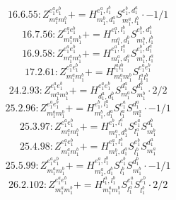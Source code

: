 \documentclass[letterpaper,10pt,fleqn,leqno,onecolumn]{article}
\begin{document}
\begin{equation} \;\;\;\;\;\;  16.6.55: Z^{e_{1}^{a}e_{1}^{b}}_{m_{1}^{a}m_{1}^{b}}+=H^{e_{1}^{a},l_{1}^{b}}_{m_{1}^{b},d_{1}^{a}}S^{e_{1}^{b},d_{1}^{a}}_{m_{1}^{a},l_{1}^{b}}\cdot -1/1 \end{equation}
\begin{equation} \;\;\;\;\;\;  16.7.56: Z^{e_{1}^{a}e_{1}^{b}}_{m_{1}^{a}m_{1}^{b}}+=H^{e_{1}^{a},l_{1}^{b}}_{m_{1}^{a},d_{1}^{b}}S^{e_{1}^{b},d_{1}^{b}}_{m_{1}^{b},l_{1}^{b}} \end{equation}
\begin{equation} \;\;\;\;\;\;  16.9.58: Z^{e_{1}^{a}e_{1}^{b}}_{m_{1}^{a}m_{1}^{b}}+=H^{e_{1}^{a},l_{1}^{a}}_{m_{1}^{a},d_{1}^{a}}S^{e_{1}^{b},d_{1}^{a}}_{m_{1}^{b},l_{1}^{a}} \end{equation}
\begin{equation} \;\;\;\;\;\;  17.2.61: Z^{e_{1}^{a}e_{1}^{b}}_{m_{1}^{a}m_{1}^{b}}+=H^{l_{1}^{a}l_{1}^{b}}_{m_{1}^{a}m_{1}^{b}}S^{e_{1}^{a}e_{1}^{b}}_{l_{1}^{a}l_{1}^{b}} \end{equation}
\begin{equation} \;\;\;\;\;\;  24.2.93: Z^{e_{1}^{a}e_{1}^{b}}_{m_{1}^{a}m_{1}^{b}}+=H^{e_{1}^{a}e_{1}^{b}}_{d_{1}^{a},d_{1}^{b}}S^{d_{1}^{a}}_{m_{1}^{a}}S^{d_{1}^{b}}_{m_{1}^{b}}\cdot 2/2 \end{equation}
\begin{equation} \;\;\;\;\;\;  25.2.96: Z^{e_{1}^{a}e_{1}^{b}}_{m_{1}^{a}m_{1}^{b}}+=H^{e_{1}^{b},l_{1}^{a}}_{m_{1}^{b},d_{1}^{a}}S^{e_{1}^{a}}_{l_{1}^{a}}S^{d_{1}^{a}}_{m_{1}^{a}}\cdot -1/1 \end{equation}
\begin{equation} \;\;\;\;\;\;  25.3.97: Z^{e_{1}^{a}e_{1}^{b}}_{m_{1}^{a}m_{1}^{b}}+=H^{e_{1}^{b},l_{1}^{a}}_{m_{1}^{a},d_{1}^{b}}S^{e_{1}^{a}}_{l_{1}^{a}}S^{d_{1}^{b}}_{m_{1}^{b}} \end{equation}
\begin{equation} \;\;\;\;\;\;  25.4.98: Z^{e_{1}^{a}e_{1}^{b}}_{m_{1}^{a}m_{1}^{b}}+=H^{e_{1}^{a},l_{1}^{b}}_{m_{1}^{b},d_{1}^{a}}S^{e_{1}^{b}}_{l_{1}^{b}}S^{d_{1}^{a}}_{m_{1}^{a}} \end{equation}
\begin{equation} \;\;\;\;\;\;  25.5.99: Z^{e_{1}^{a}e_{1}^{b}}_{m_{1}^{a}m_{1}^{b}}+=H^{e_{1}^{a},l_{1}^{b}}_{m_{1}^{a},d_{1}^{b}}S^{e_{1}^{b}}_{l_{1}^{b}}S^{d_{1}^{b}}_{m_{1}^{b}}\cdot -1/1 \end{equation}
\begin{equation} \;\;\;\;\;\;  26.2.102: Z^{e_{1}^{a}e_{1}^{b}}_{m_{1}^{a}m_{1}^{b}}+=H^{l_{1}^{a},l_{1}^{b}}_{m_{1}^{a}m_{1}^{b}}S^{e_{1}^{a}}_{l_{1}^{a}}S^{e_{1}^{b}}_{l_{1}^{b}}\cdot 2/2 \end{equation}
\end{document}
